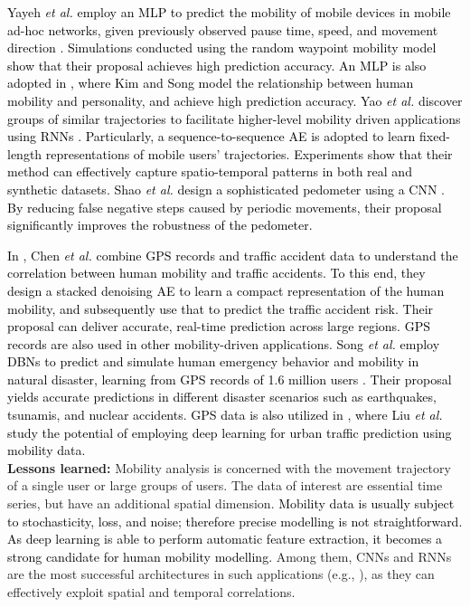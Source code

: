 \documentclass[journal,comsoc,letter]{IEEEtran}
\newcommand{\rev}[1]{\textcolor{black}{#1}}
\begin{document}
\rev{Yayeh \emph{et al.} employ an MLP to predict the mobility of mobile devices in mobile ad-hoc networks, given previously observed pause time, speed, and movement direction \cite{yayeh2018mobility}. Simulations conducted using the random waypoint mobility model show that their proposal achieves high prediction accuracy. An MLP is also adopted in \cite{kim2018method}, where Kim and Song model the relationship between human mobility and personality, and achieve high prediction accuracy. Yao \emph{et al.} discover groups of similar trajectories to facilitate higher-level mobility driven applications using RNNs \cite{yao2017trajectory}. Particularly, a sequence-to-sequence AE is adopted to learn fixed-length representations of mobile users' trajectories. Experiments show that their method can effectively capture spatio-temporal patterns in both real and synthetic datasets. Shao \emph{et al.} design a sophisticated pedometer using a CNN \cite{shao2018depedo}. By reducing false negative steps caused by periodic movements, their proposal significantly improves the robustness of the pedometer.}

\rev{In \cite{chen2016learning2}, Chen \emph{et al.} combine GPS records and traffic accident data to understand the correlation between human mobility and traffic accidents. To this end, they design a stacked denoising AE to learn a compact representation of the human mobility, and subsequently use that to predict the traffic accident risk. Their proposal can deliver accurate, real-time prediction across large regions. GPS records are also used in other mobility-driven applications. Song \emph{et al.} employ DBNs to predict and simulate human emergency behavior and mobility in natural disaster, learning from GPS records of 1.6 million users \cite{song2017deepmob}. Their proposal yields accurate predictions in different disaster scenarios such as earthquakes, tsunamis, and nuclear accidents. GPS data is also utilized in \cite{liu2018urban}, where Liu \emph{et al.} study the potential of employing deep learning for urban traffic prediction using mobility data.
}\\

\noindent\textbf{Lessons learned:} Mobility analysis is concerned with the movement trajectory of a single user or large groups of users. The data of interest are essential time series, but have an additional spatial dimension. \rev{Mobility data is usually subject to stochasticity, loss, and noise; therefore precise modelling is not straightforward. As deep learning is able to perform automatic feature extraction, it becomes a strong candidate for human mobility modelling.} Among them, CNNs and RNNs are the most successful architectures in such applications (e.g., \cite{ouyang2016deepspace, yang2017neural, song2016deeptransport, zhang2017deep123, lin2017deep}), as they can effectively exploit spatial and temporal correlations. 
\end{document}
